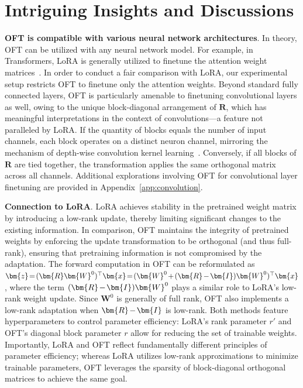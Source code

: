 \section{Intriguing Insights and Discussions}

\textbf{OFT is compatible with various neural network architectures}. In theory, OFT can be utilized with any neural network model. For example, in Transformers, LoRA is generally utilized to finetune the attention weight matrices~\cite{hulora2022}. In order to conduct a fair comparison with LoRA, our experimental setup restricts OFT to finetune only the attention weights. Beyond standard fully connected layers, OFT is particularly amenable to finetuning convolutional layers as well, owing to the unique block-diagonal arrangement of $\bm{R}$, which has meaningful interpretations in the context of convolutions—a feature not paralleled by LoRA. If the quantity of blocks equals the number of input channels, each block operates on a distinct neuron channel, mirroring the mechanism of depth-wise convolution kernel learning~\cite{chollet2017xception}. Conversely, if all blocks of $\bm{R}$ are tied together, the transformation applies the same orthogonal matrix across all channels. Additional explorations involving OFT for convolutional layer finetuning are provided in Appendix~\ref{app:convolution}.

\textbf{Connection to LoRA}. LoRA achieves stability in the pretrained weight matrix by introducing a low-rank update, thereby limiting significant changes to the existing information. In comparison, OFT maintains the integrity of pretrained weights by enforcing the update transformation to be orthogonal (and thus full-rank), ensuring that pretraining information is not compromised by the adaptation. The forward computation in OFT can be reformulated as $\thickmuskip=2mu \medmuskip=2mu \bm{z}=(\bm{R}\bm{W}^0)^\top\bm{x}=(\bm{W}^0+(\bm{R}-\bm{I})\bm{W}^0)^\top\bm{x}$, where the term $\thickmuskip=2mu \medmuskip=2mu (\bm{R}-\bm{I})\bm{W}^0$ plays a similar role to LoRA’s low-rank weight update. Since $\bm{W}^0$ is generally of full rank, OFT also implements a low-rank adaptation when $\thickmuskip=2mu \medmuskip=2mu \bm{R}-\bm{I}$ is low-rank. Both methods feature hyperparameters to control parameter efficiency: LoRA’s rank parameter $r'$ and OFT’s diagonal block parameter $r$ allow for reducing the set of trainable weights. Importantly, LoRA and OFT reflect fundamentally different principles of parameter efficiency; whereas LoRA utilizes low-rank approximations to minimize trainable parameters, OFT leverages the sparsity of block-diagonal orthogonal matrices to achieve the same goal.

